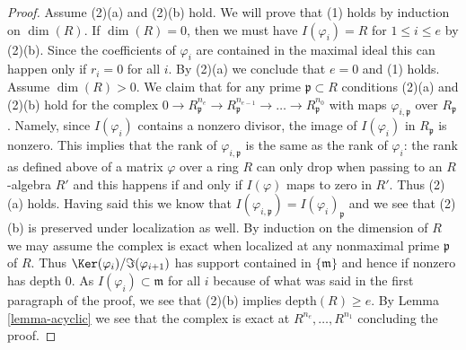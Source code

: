 \begin{proof}
\medskip\noindent
Assume (2)(a) and (2)(b) hold. We will prove that (1) holds by
induction on $\dim(R)$. If $\dim(R) = 0$, then we must have
$I(\varphi_i) = R$ for $1 \leq i \leq e$ by (2)(b). Since the
coefficients of $\varphi_i$ are contained in the maximal ideal
this can happen only if $r_i = 0$ for all $i$. By (2)(a) we
conclude that $e = 0$ and (1) holds. Assume $\dim(R) > 0$.
We claim that for any prime $\mathfrak p \subset R$ conditions
(2)(a) and (2)(b) hold for the complex
$0 \to R_\mathfrak p^{n_e} \to R_\mathfrak p^{n_{e - 1}} \to \ldots \to
R_\mathfrak p^{n_0}$ with maps $\varphi_{i, \mathfrak p}$
over $R_\mathfrak p$. Namely, since $I(\varphi_i)$ contains a
nonzero divisor, the image of $I(\varphi_i)$ in $R_\mathfrak p$
is nonzero. This implies that the rank of $\varphi_{i, \mathfrak p}$
is the same as the rank of $\varphi_i$: the rank as defined above
of a matrix $\varphi$ over a ring $R$ can only drop when passing
to an $R$-algebra $R'$ and this happens if and only if $I(\varphi)$
maps to zero in $R'$. Thus (2)(a) holds. Having said this
we know that $I(\varphi_{i, \mathfrak p}) = I(\varphi_i)_\mathfrak p$
and we see that (2)(b) is preserved under localization as well.
By induction on the dimension of $R$ we may assume the complex
is exact when localized at any nonmaximal prime $\mathfrak p$ of $R$.
Thus $\Ker(\varphi_i)/\Im(\varphi_{i + 1})$ has support contained in
$\{\mathfrak m\}$ and hence if nonzero has depth $0$.
As $I(\varphi_i) \subset \mathfrak m$ for all $i$ because
of what was said in the first paragraph of the proof, we
see that (2)(b) implies $\text{depth}(R) \geq e$.
By Lemma \ref{lemma-acyclic} we see
that the complex is exact at $R^{n_e}, \ldots, R^{n_1}$
concluding the proof.
\end{proof}